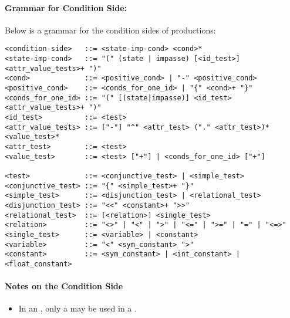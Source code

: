 \paragraph{Grammar for Condition Side:}
\label{SYNTAX-pm-condgrammar}

Below is a grammar for the condition sides of productions:
\begin{verbatim}
<condition-side>   ::= <state-imp-cond> <cond>*
<state-imp-cond>   ::= "(" (state | impasse) [<id_test>]
<attr_value_tests>+ ")"
<cond>             ::= <positive_cond> | "-" <positive_cond>
<positive_cond>    ::= <conds_for_one_id> | "{" <cond>+ "}"
<conds_for_one_id> ::= "(" [(state|impasse)] <id_test> 
<attr_value_tests>+ ")"
<id_test>          ::= <test>
<attr_value_tests> ::= ["-"] "^" <attr_test> ("." <attr_test>)*
<value_test>*
<attr_test>        ::= <test>
<value_test>       ::= <test> ["+"] | <conds_for_one_id> ["+"]  

<test>             ::= <conjunctive_test> | <simple_test>
<conjunctive_test> ::= "{" <simple_test>+ "}"
<simple_test>      ::= <disjunction_test> | <relational_test>
<disjunction_test> ::= "<<" <constant>+ ">>"
<relational_test>  ::= [<relation>] <single_test>
<relation>         ::= "<>" | "<" | ">" | "<=" | ">=" | "=" | "<=>"
<single_test>      ::= <variable> | <constant>
<variable>         ::= "<" <sym_constant> ">"
<constant>         ::= <sym_constant> | <int_constant> | <float_constant>
\end{verbatim}

\paragraph*{Notes on the Condition Side}\vspace{-12pt}
\begin{itemize}
	\item In an , only a  may be used in a .
\end{itemize}




